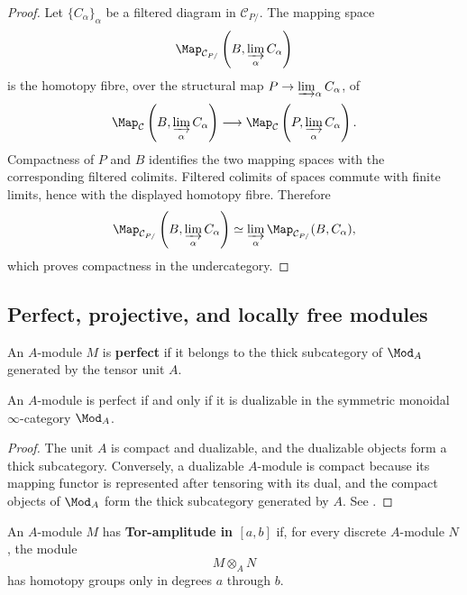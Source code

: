 \begin{proof}
Let $\{C_\alpha\}_\alpha$ be a filtered diagram in $\mathcal C_{P/}$.
The mapping space
\[
    \Map_{\mathcal C_{P/}}
    \left(
        B,
        \varinjlim_\alpha C_\alpha
    \right)
\]
is the homotopy fibre, over the structural map
$P\to\varinjlim_\alpha C_\alpha$, of
\[
    \Map_{\mathcal C}
    \left(
        B,
        \varinjlim_\alpha C_\alpha
    \right)
    \longrightarrow
    \Map_{\mathcal C}
    \left(
        P,
        \varinjlim_\alpha C_\alpha
    \right).
\]
Compactness of $P$ and $B$ identifies the two mapping spaces with the
corresponding filtered colimits. Filtered colimits of spaces commute with
finite limits, hence with the displayed homotopy fibre. Therefore
\[
    \Map_{\mathcal C_{P/}}
    \left(
        B,
        \varinjlim_\alpha C_\alpha
    \right)
    \simeq
    \varinjlim_\alpha
    \Map_{\mathcal C_{P/}}(B,C_\alpha),
\]
which proves compactness in the undercategory.
\end{proof}

\subsection{Perfect, projective, and locally free modules}

\begin{definition}
\label{def:perfect-module-spectrum}
An $A$-module $M$ is \textbf{perfect} if it belongs to the thick
subcategory of $\Mod_A$ generated by the tensor unit $A$.
\end{definition}

\begin{proposition}
\label{prop:perfect-equals-dualizable}
An $A$-module is perfect if and only if it is dualizable in the symmetric
monoidal $\infty$-category $\Mod_A$.
\end{proposition}

\begin{proof}
The unit $A$ is compact and dualizable, and the dualizable objects form a
thick subcategory. Conversely, a dualizable $A$-module is compact because
its mapping functor is represented after tensoring with its dual, and the
compact objects of $\Mod_A$ form the thick subcategory generated by $A$.
See \cite{LurieHigherAlgebra}.
\end{proof}

\begin{definition}
\label{def:tor-amplitude}
An $A$-module $M$ has \textbf{Tor-amplitude in $[a,b]$} if, for every
discrete $A$-module $N$, the module
\[
    M\otimes_A N
\]
has homotopy groups only in degrees $a$ through $b$.
\end{definition}


